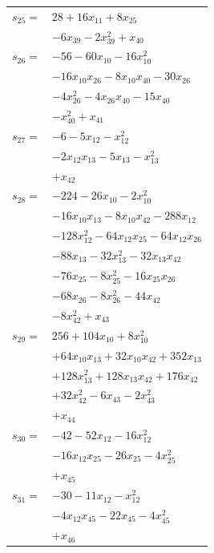 \begin{longtable}{@{}r@{\;}l@{}}
\(s_{25}=\) & \(\displaystyle 28 +16x_{11} +8x_{25}\) \\
 & \(\displaystyle -6x_{39} -2x_{39}^{2} +x_{40}\) \\[3pt]
\(s_{26}=\) & \(\displaystyle -56 -60x_{10} -16x_{10}^{2}\) \\
 & \(\displaystyle -16x_{10}x_{26} -8x_{10}x_{40} -30x_{26}\) \\
 & \(\displaystyle -4x_{26}^{2} -4x_{26}x_{40} -15x_{40}\) \\
 & \(\displaystyle -x_{40}^{2} +x_{41}\) \\[3pt]
\(s_{27}=\) & \(\displaystyle -6 -5x_{12} -x_{12}^{2}\) \\
 & \(\displaystyle -2x_{12}x_{13} -5x_{13} -x_{13}^{2}\) \\
 & \(\displaystyle +x_{42}\) \\[3pt]
\(s_{28}=\) & \(\displaystyle -224 -26x_{10} -2x_{10}^{2}\) \\
 & \(\displaystyle -16x_{10}x_{13} -8x_{10}x_{42} -288x_{12}\) \\
 & \(\displaystyle -128x_{12}^{2} -64x_{12}x_{25} -64x_{12}x_{26}\) \\
 & \(\displaystyle -88x_{13} -32x_{13}^{2} -32x_{13}x_{42}\) \\
 & \(\displaystyle -76x_{25} -8x_{25}^{2} -16x_{25}x_{26}\) \\
 & \(\displaystyle -68x_{26} -8x_{26}^{2} -44x_{42}\) \\
 & \(\displaystyle -8x_{42}^{2} +x_{43}\) \\[3pt]
\(s_{29}=\) & \(\displaystyle 256 +104x_{10} +8x_{10}^{2}\) \\
 & \(\displaystyle +64x_{10}x_{13} +32x_{10}x_{42} +352x_{13}\) \\
 & \(\displaystyle +128x_{13}^{2} +128x_{13}x_{42} +176x_{42}\) \\
 & \(\displaystyle +32x_{42}^{2} -6x_{43} -2x_{43}^{2}\) \\
 & \(\displaystyle +x_{44}\) \\[3pt]
\(s_{30}=\) & \(\displaystyle -42 -52x_{12} -16x_{12}^{2}\) \\
 & \(\displaystyle -16x_{12}x_{25} -26x_{25} -4x_{25}^{2}\) \\
 & \(\displaystyle +x_{45}\) \\[3pt]
\(s_{31}=\) & \(\displaystyle -30 -11x_{12} -x_{12}^{2}\) \\
 & \(\displaystyle -4x_{12}x_{45} -22x_{45} -4x_{45}^{2}\) \\
 & \(\displaystyle +x_{46}\) \\[3pt]

\end{longtable}
